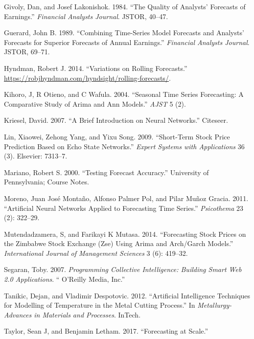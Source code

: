 \documentclass[12pt,a4paper]{article}
\numberwithin{equation}{section}
\numberwithin{figure}{section}
\numberwithin{table}{section}
\begin{document}
\hypertarget{ref-givoly1984quality}{}
Givoly, Dan, and Josef Lakonishok. 1984. ``The Quality of Analysts'
Forecasts of Earnings.'' \emph{Financial Analysts Journal}. JSTOR,
40--47.

\hypertarget{ref-guerard1989combining}{}
Guerard, John B. 1989. ``Combining Time-Series Model Forecasts and
Analysts' Forecasts for Superior Forecasts of Annual Earnings.''
\emph{Financial Analysts Journal}. JSTOR, 69--71.

\hypertarget{ref-RJHyndman2014}{}
Hyndman, Robert J. 2014. ``Variations on Rolling Forecasts.''
\url{https://robjhyndman.com/hyndsight/rolling-forecasts/}.

\hypertarget{ref-kihoro2004seasonal}{}
Kihoro, J, R Otieno, and C Wafula. 2004. ``Seasonal Time Series
Forecasting: A Comparative Study of Arima and Ann Models.'' \emph{AJST}
5 (2).

\hypertarget{ref-kriesel2007brief}{}
Kriesel, David. 2007. ``A Brief Introduction on Neural Networks.''
Citeseer.

\hypertarget{ref-lin2009short}{}
Lin, Xiaowei, Zehong Yang, and Yixu Song. 2009. ``Short-Term Stock Price
Prediction Based on Echo State Networks.'' \emph{Expert Systems with
Applications} 36 (3). Elsevier: 7313--7.

\hypertarget{ref-Mariano2000}{}
Mariano, Robert S. 2000. ``Testing Forecast Accuracy.'' University of
Pennsylvania; Course Notes.

\hypertarget{ref-moreno2011artificial}{}
Moreno, Juan José Montaño, Alfonso Palmer Pol, and Pilar Muñoz Gracia.
2011. ``Artificial Neural Networks Applied to Forecasting Time Series.''
\emph{Psicothema} 23 (2): 322--29.

\hypertarget{ref-Muten2014}{}
Mutendadzamera, S, and Farikayi K Mutasa. 2014. ``Forecasting Stock
Prices on the Zimbabwe Stock Exchange (Zse) Using Arima and Arch/Garch
Models.'' \emph{International Journal of Management Sciences} 3 (6):
419--32.

\hypertarget{ref-segaran2007programming}{}
Segaran, Toby. 2007. \emph{Programming Collective Intelligence: Building
Smart Web 2.0 Applications}. `` O'Reilly Media, Inc.''

\hypertarget{ref-tanikic2012artificial}{}
Tanikic, Dejan, and Vladimir Despotovic. 2012. ``Artificial Intelligence
Techniques for Modelling of Temperature in the Metal Cutting Process.''
In \emph{Metallurgy-Advances in Materials and Processes}. InTech.

\hypertarget{ref-taylor2017forecasting}{}
Taylor, Sean J, and Benjamin Letham. 2017. ``Forecasting at Scale.''
\end{document}
